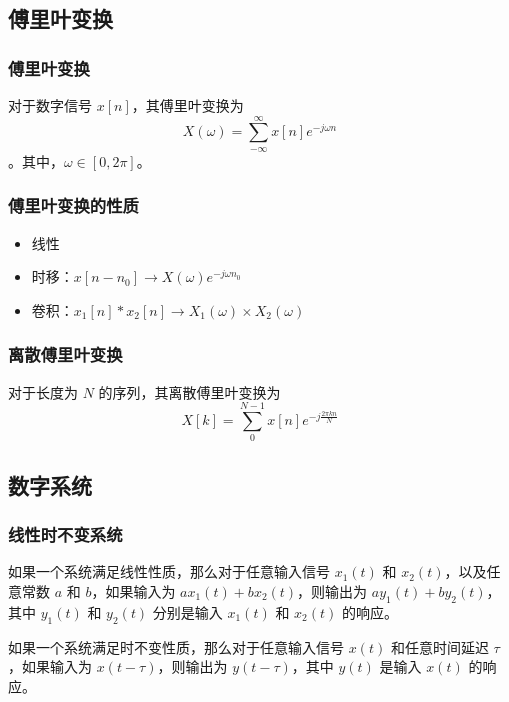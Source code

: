 \documentclass{ctexbeamer}
\begin{document}
	\subsection{傅里叶变换}

	\begin{frame}
		\frametitle{傅里叶变换}
		\begin{definition}[傅里叶变换]
			对于数字信号 $x[n]$，其傅里叶变换为 $$X(\omega)=\sum_{-\infty}^{\infty}x[n]e^{-j\omega n}$$。其中，$\omega\in [0,2\pi]$。
		\end{definition}
	\end{frame}

	\begin{frame}
		\frametitle{傅里叶变换的性质}
		\begin{itemize}
			\item 线性
			\item 时移：$x[n-n_0]\rightarrow X(\omega)e^{-j\omega n_0}$
			\item 卷积：$x_1[n]*x_2[n]\rightarrow X_1(\omega)\times X_2(\omega)$
		\end{itemize}
	\end{frame}
	
	\begin{frame}
		\frametitle{离散傅里叶变换}
		\begin{definition}[离散傅里叶变换]
			对于长度为 $N$ 的序列，其离散傅里叶变换为 $$X[k]=\sum_0^{N-1}x[n]e^{-j\frac{2\pi k n}{N}}$$
		\end{definition}
	\end{frame}

	\subsection{数字系统}

	\begin{frame}
		\frametitle{线性时不变系统}
		\begin{definition}[线性系统]
			如果一个系统满足线性性质，那么对于任意输入信号 $x_{1}(t)$ 和 $x_{2}(t)$，以及任意常数 $a$ 和 $b$，如果输入为 $ax_{1}(t)+bx_{2}(t)$，则输出为 $ay_{1}(t)+by_{2}(t)$，其中 $y_{1}(t)$ 和 $y_{2}(t)$ 分别是输入 $x_{1}(t)$ 和 $x_{2}(t)$ 的响应。
		\end{definition}
		\begin{definition}[时不变系统]
			如果一个系统满足时不变性质，那么对于任意输入信号 $x(t)$ 和任意时间延迟 $\tau$，如果输入为 $x(t-\tau)$，则输出为 $y(t-\tau )$，其中 $y(t)$ 是输入 $x(t)$ 的响应。
		\end{definition}
	\end{frame}
\end{document}
